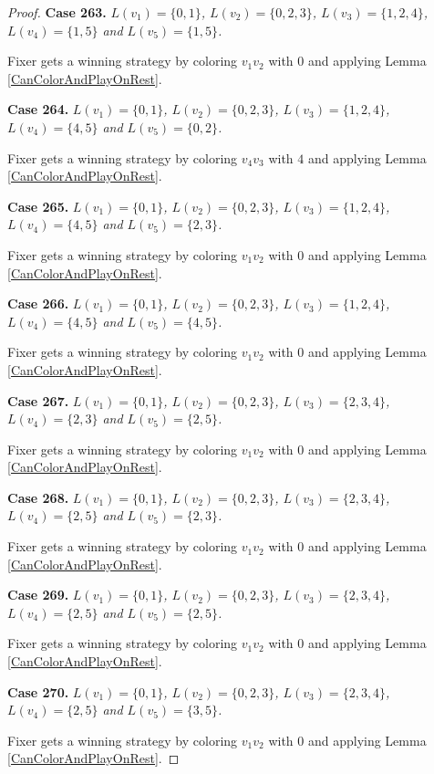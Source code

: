 \documentclass[12pt]{amsart}
\theoremstyle{plain}
\theoremstyle{definition}
\theoremstyle{remark}
\begin{document}
\begin{proof}
\noindent\textbf{Case 263.  }\textit{$L(v_1) = \{0, 1\}$, $L(v_2) = \{0, 2, 3\}$, $L(v_3) = \{1, 2, 4\}$, $L(v_4) = \{1, 5\}$ and $L(v_5) = \{1, 5\}$.}

Fixer gets a winning strategy by coloring $v_1v_2$ with $0$ and applying Lemma \ref{CanColorAndPlayOnRest}.

\noindent\textbf{Case 264.  }\textit{$L(v_1) = \{0, 1\}$, $L(v_2) = \{0, 2, 3\}$, $L(v_3) = \{1, 2, 4\}$, $L(v_4) = \{4, 5\}$ and $L(v_5) = \{0, 2\}$.}

Fixer gets a winning strategy by coloring $v_4v_3$ with $4$ and applying Lemma \ref{CanColorAndPlayOnRest}.

\noindent\textbf{Case 265.  }\textit{$L(v_1) = \{0, 1\}$, $L(v_2) = \{0, 2, 3\}$, $L(v_3) = \{1, 2, 4\}$, $L(v_4) = \{4, 5\}$ and $L(v_5) = \{2, 3\}$.}

Fixer gets a winning strategy by coloring $v_1v_2$ with $0$ and applying Lemma \ref{CanColorAndPlayOnRest}.

\noindent\textbf{Case 266.  }\textit{$L(v_1) = \{0, 1\}$, $L(v_2) = \{0, 2, 3\}$, $L(v_3) = \{1, 2, 4\}$, $L(v_4) = \{4, 5\}$ and $L(v_5) = \{4, 5\}$.}

Fixer gets a winning strategy by coloring $v_1v_2$ with $0$ and applying Lemma \ref{CanColorAndPlayOnRest}.

\noindent\textbf{Case 267.  }\textit{$L(v_1) = \{0, 1\}$, $L(v_2) = \{0, 2, 3\}$, $L(v_3) = \{2, 3, 4\}$, $L(v_4) = \{2, 3\}$ and $L(v_5) = \{2, 5\}$.}

Fixer gets a winning strategy by coloring $v_1v_2$ with $0$ and applying Lemma \ref{CanColorAndPlayOnRest}.

\noindent\textbf{Case 268.  }\textit{$L(v_1) = \{0, 1\}$, $L(v_2) = \{0, 2, 3\}$, $L(v_3) = \{2, 3, 4\}$, $L(v_4) = \{2, 5\}$ and $L(v_5) = \{2, 3\}$.}

Fixer gets a winning strategy by coloring $v_1v_2$ with $0$ and applying Lemma \ref{CanColorAndPlayOnRest}.

\noindent\textbf{Case 269.  }\textit{$L(v_1) = \{0, 1\}$, $L(v_2) = \{0, 2, 3\}$, $L(v_3) = \{2, 3, 4\}$, $L(v_4) = \{2, 5\}$ and $L(v_5) = \{2, 5\}$.}

Fixer gets a winning strategy by coloring $v_1v_2$ with $0$ and applying Lemma \ref{CanColorAndPlayOnRest}.

\noindent\textbf{Case 270.  }\textit{$L(v_1) = \{0, 1\}$, $L(v_2) = \{0, 2, 3\}$, $L(v_3) = \{2, 3, 4\}$, $L(v_4) = \{2, 5\}$ and $L(v_5) = \{3, 5\}$.}

Fixer gets a winning strategy by coloring $v_1v_2$ with $0$ and applying Lemma \ref{CanColorAndPlayOnRest}.


\end{proof}
\end{document}
